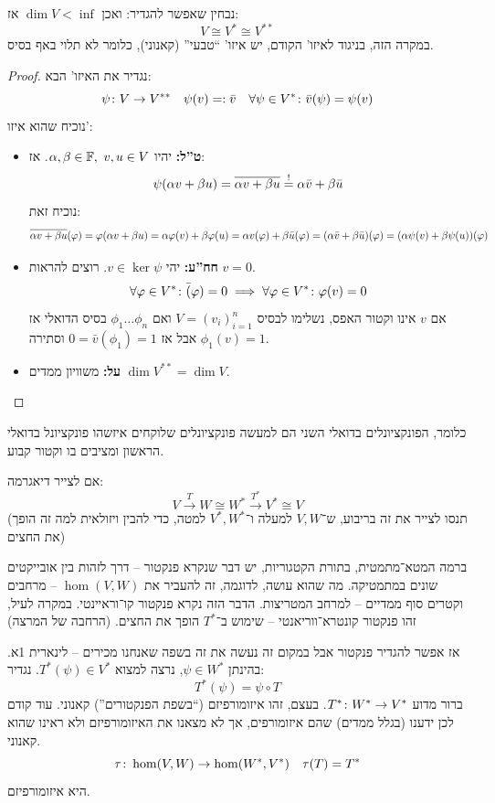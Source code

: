 \documentclass[]{../../../../tex/classes/styledArticle}
\begin{document}
	נבחין שאפשר להגדיר: 
	ואכן $\dim V < \inf$ אז: 
	\[ V \cong V^* \cong V^{**} \]
	במקרה הזה, בניגוד לאיזו' הקודם, יש איזו' ``טבעי'' (קאנוני), כלומר לא תלוי באף בסיס. 
	
	\begin{proof}נגדיר את האיזו' הבא: 
		\[ \psi \colon V \to V^{**} \quad \psi(v) =: \bar v \quad \forall \psi \in V^* \colon \bar v(\psi) = \psi(v) \]
		נוכיח שהוא איזו': 
		\begin{itemize}
			\item \textbf{ט''ל: }יהיו $\alpha, \beta \in \mathbb{F}, \ v, u \in V$. אז: 
			\[ \psi(\alpha v + \beta u) = \overline{\alpha v + \beta u} \overset{!}{=} \alpha \bar v + \beta \bar u \]
			נוכיח זאת: 
			\[ \overline{\alpha v + \beta u}(\varphi) = \varphi(\alpha v + \beta u) = \alpha \varphi(v) + \beta \varphi(u) = \alpha v(\varphi) + \beta \bar u(\varphi) = (\alpha \bar v + \beta \bar u)(\varphi) = (\alpha \psi(v) + \beta \psi(u))(\varphi) \]
			\item \textbf{חח''ע: }יהי $v \in \ker \psi$. רוצים להראות $v = 0$. 
			\[ \forall \varphi \in V^* \colon \bar (\varphi) = 0 \implies \forall \varphi \in V^* \colon \varphi(v) = 0 \]
			אם $v$ אינו וקטור האפס, נשלימו לבסיס $V = (v_i)_{i = 1}^{n}$ ואם $\phi_1 \dots \phi_n$ בסיס הדואלי אז $\phi_1(v) = 1$ אבל אז $0 = \bar v(\phi_1) = 1$ וסתירה. 
			\item \textbf{על: }משוויון ממדים $\dim V^{**} = \dim V$. 
		\end{itemize}
	\end{proof}
	כלומר, הפונקציונלים בדואלי השני הם למעשה פונקציונלים שלוקחים איזשהו פונקציונל בדואלי הראשון ומציבים בו וקטור קבוע. 
	
	
	אם לצייר דיאגרמה: 
	\[ V \overset{T}{\to} W \cong W^* \overset{T^*}{\to} V^* \cong V \]
	(תנסו לצייר את זה בריבוע, ש־$V, W$ למעלה ו־$V^*, W^*$ למטה, כדי להבין ויזולאית למה זה הופך את החצים)
	
	ברמה המטא־מתמטית, בתורת הקטגוריות, יש דבר שנקרא פנקטור – דרך לזהות בין אובייקטים שונים במתמטיקה. מה שהוא עושה, לדוגמה, זה להעביר את $\hom(V, W)$ – מרחבים וקטרים סוף ממדיים – למרחב המטריצות. הדבר הזה נקרא פנקטור קו־וראיינטי. במקרה לעיל, זהו פנקטור קונטרא־ווריאנטי – שימוש ב־$T^*$ הופך את החצים. (הרחבה של המרצה)
	
	אז אפשר להגדיר פנקטור אבל במקום זה נעשה את זה בשפה שאנחנו מכירים – לינארית 1א. בהינתן $\psi \in W^*$, נרצה למצוא $T^*(\psi) \in V^*$. נגדיר: 
	\[ T^*(\psi) = \psi \circ T \]
	ברור מדוע $T^* \colon W^* \to V^*$. בעצם, זהו איזומורפיזם (``בשפת הפנקטורים'') קאנוני. עוד קודם לכן ידענו (בגלל ממדים) שהם איזומורפים, אך לא מצאנו את האיזומורפיזם ולא ראינו שהוא קאנוני. 
	\[ \tau \colon \hom(V, W) \to \hom(W^*, V^*) \quad \tau(T) = T^*  \]
	היא איזומורפיזם. 
	
\end{document}
